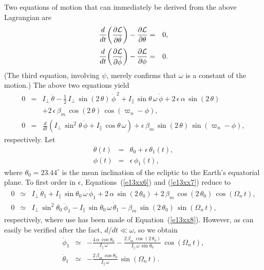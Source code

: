 Two equations of motion that can immediately be derived from the above Lagrangian are
\begin{eqnarray}
\frac{d}{dt}\!\left(\frac{\partial {\cal L}}{\partial \dot{\theta}}\right)-\frac{\partial{\cal L}}{\partial \theta} &=&0,\\[0.5ex]
\frac{d}{dt}\!\left(\frac{\partial {\cal L}}{\partial \dot{\phi}}\right)-\frac{\partial{\cal L}}{\partial \phi} &=&0.
\end{eqnarray}
(The third equation, involving $\psi$, merely confirms that $\omega$ is a constant of the motion.)
The above two equations yield
\begin{eqnarray}\label{e13xx6}
0&=&I_\perp\,\ddot{\theta} - \frac{1}{2}\,I_\perp\,\sin(2\,\theta)\,\dot{\phi}^{\,2} + I_{\parallel}\,\sin\theta\,\omega\,\dot{\phi}
+2\,\epsilon\,\alpha\,\sin(2\,\theta) \nonumber\\[0.5ex]&&+ 2\,\epsilon\,\beta_m\,\cos(2\,\theta)\,\cos(\varpi_n-\phi),\\[0.5ex]\label{e13xx7}
0&=&\frac{d}{dt}\!\left(I_\perp\,\sin^2\theta\,\dot{\phi} + I_{\parallel}\,\cos\theta\,\omega\right) + \epsilon\,\beta_m\,\sin(2\,\theta)\,\sin(\varpi_n-\phi),
\end{eqnarray}
respectively. 
Let
\begin{eqnarray}\label{e13xx9}
\theta(t)&=&\theta_0+ \epsilon\,\theta_1(t),\\[0.5ex]
\phi(t) &=& \epsilon\,\phi_1(t),\label{e13xx10}
\end{eqnarray}
where $\theta_0=23.44^\circ$ is the mean inclination of the ecliptic to the Earth's equatorial plane. To first order in $\epsilon$, 
Equations~(\ref{e13xx6}) and (\ref{e13xx7}) reduce to 
\begin{eqnarray}
0&\simeq&I_\perp\,\ddot{\theta}_1 + I_{\parallel}\,\sin\theta_0\,\omega\,\dot{\phi}_1
+2\,\alpha\,\sin(2\,\theta_0) + 2\,\beta_m\,\cos(2\,\theta_0)\,\cos(\Omega_n\,t),\\[0.5ex]
0&\simeq&I_\perp\,\sin^2\theta_0\,\ddot{\phi}_1 - I_{\parallel}\,\sin\theta_0\,\omega\,\dot{\theta}_1 - \beta_m\,\sin(2\,\theta_0)\,\sin(\Omega_n\,t),
\end{eqnarray}
respectively, where use has been made of Equation~(\ref{e13xx8}). 
However, as can easily be verified after the fact, $d/dt\ll \omega$,
so we obtain
\begin{eqnarray}
\dot{\phi}_1 &\simeq& -\frac{4\,\alpha\,\cos\theta_0}{I_\parallel\,\omega}-\frac{2\,\beta_m\,\cos(2\,\theta_0)}{I_\parallel\,\omega\,\sin\theta_0}\,\cos(\Omega_n\,t),\\[0.5ex]
\dot{\theta}_1&\simeq& -\frac{2\,\beta_m\,\cos\theta_0}{I_\parallel\,\omega}\,\sin(\Omega_n\,t).
\end{eqnarray}
